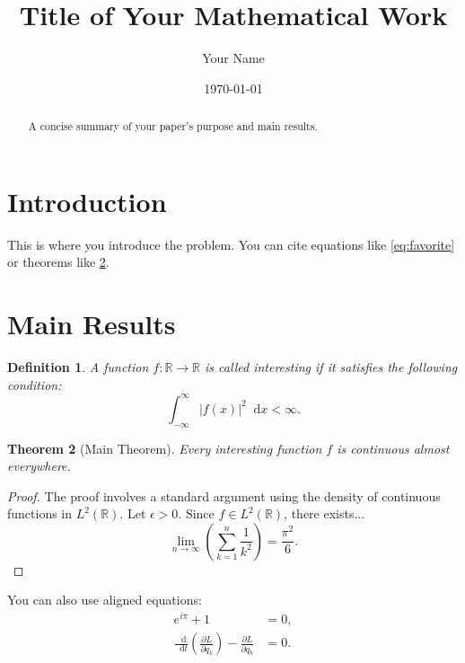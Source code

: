 \documentclass[11pt, a4paper]{article} %
\title{Title of Your Mathematical Work}
\author{Your Name}
\date{\today} %
\newtheorem{theorem}{Theorem}[section]
\newtheorem{definition}[theorem]{Definition}
\newcommand{\R}{\mathbb{R}} %
\newcommand{\diff}{\mathop{}\!\mathrm{d}} %
\begin{document}
\maketitle

\begin{abstract}
    A concise summary of your paper's purpose and main results.
\end{abstract}

\section{Introduction}
\label{sec:introduction}

This is where you introduce the problem. You can cite equations like \eqref{eq:favorite} or theorems like \ref{thm:main}.

\section{Main Results}
\label{sec:main_results}

\begin{definition}
    A function \( f: \R \to \R \) is called \emph{interesting} if it satisfies the following condition:
    \[
        \int_{-\infty}^{\infty} |f(x)|^2 \diff x < \infty.
    \]
\end{definition}

\begin{theorem}[Main Theorem]
\label{thm:main}
    Every interesting function \( f \) is continuous almost everywhere.
\end{theorem}

\begin{proof}
    The proof involves a standard argument using the density of continuous functions in \( L^2(\R) \). Let \( \epsilon > 0 \). Since \( f \in L^2(\R) \), there exists...
    \[
        \lim_{n \to \infty} \left( \sum_{k=1}^{n} \frac{1}{k^2} \right) = \frac{\pi^2}{6}.
    \]
    \qedhere %
\end{proof}

You can also use aligned equations:
\begin{equation}
\label{eq:favorite}
    \begin{aligned}
        e^{i\pi} + 1 &= 0, \\
        \frac{\diff}{\diff t} \left( \frac{\partial L}{\partial \dot{q}_k} \right) - \frac{\partial L}{\partial q_k} &= 0.
    \end{aligned}
\end{equation}
\end{document}
